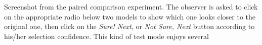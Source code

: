 Screenshot from the paired comparison experiment. The observer is asked to click on the appropriate radio below two models to show which one looks closer to the original one, then click on the \emph{Sure! Next}, or \emph{Not Sure, Next} button according to his/her selection confidence.  This kind of test mode enjoys several 